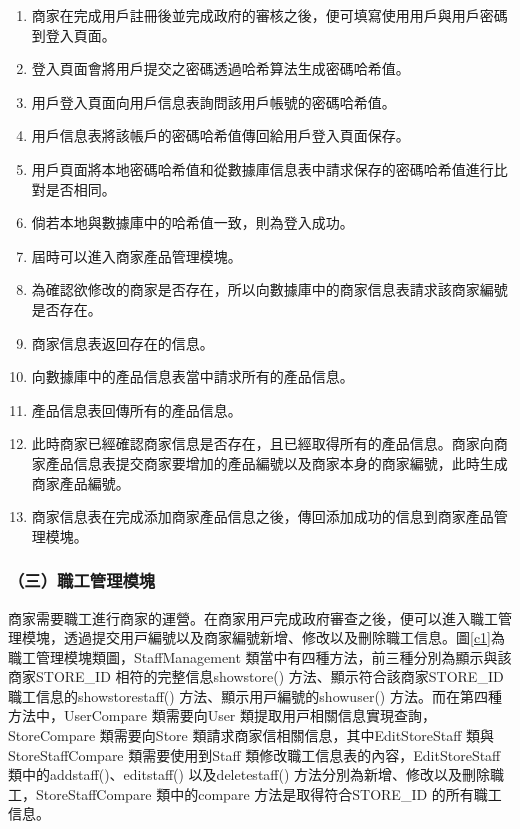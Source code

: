 	\begin{enumerate}
	\item 商家在完成用戶註冊後並完成政府的審核之後，便可填寫使用用戶與用戶密碼到登入頁面。
	\item 登入頁面會將用戶提交之密碼透過哈希算法生成密碼哈希值。
	\item 用戶登入頁面向用戶信息表詢問該用戶帳號的密碼哈希值。
	\item 用戶信息表將該帳戶的密碼哈希值傳回給用戶登入頁面保存。
	\item 用戶頁面將本地密碼哈希值和從數據庫信息表中請求保存的密碼哈希值進行比對是否相同。
	\item 倘若本地與數據庫中的哈希值一致，則為登入成功。
	\item 屆時可以進入商家產品管理模塊。
	\item 為確認欲修改的商家是否存在，所以向數據庫中的商家信息表請求該商家編號是否存在。
	\item 商家信息表返回存在的信息。
	\item 向數據庫中的產品信息表當中請求所有的產品信息。
	\item 產品信息表回傳所有的產品信息。
	\item 此時商家已經確認商家信息是否存在，且已經取得所有的產品信息。商家向商家產品信息表提交商家要增加的產品編號以及商家本身的商家編號，此時生成商家產品編號。
	\item 商家信息表在完成添加商家產品信息之後，傳回添加成功的信息到商家產品管理模塊。
	\end{enumerate}


\subsubsection{（三）職工管理模塊}
商家需要職⼯進⾏商家的運營。在商家⽤⼾完成政府審查之後，便可以進⼊職⼯管理模塊，透過提交⽤⼾編號以及商家編號新增、修改以及刪除職⼯信息。圖\ref{c1}為職⼯管理模塊類圖，StaffManagement 類當中有四種⽅法，前三種分別為顯⽰與該商家STORE\_ID 相符的完整信息showstore() ⽅法、顯⽰符合該商家STORE\_ID 職⼯信息的showstorestaff() ⽅法、顯⽰⽤⼾編號的showuser() ⽅法。而在第四種方法中，UserCompare 類需要向User 類提取⽤⼾相關信息實現查詢，StoreCompare 類需要向Store 類請求商家信相關信息，其中EditStoreStaff 類與StoreStaffCompare 類需要使⽤到Staff 類修改職⼯信息表的內容，EditStoreStaff 類中的addstaff()、editstaff() 以及deletestaff() ⽅法分別為新增、修改以及刪除職⼯，StoreStaffCompare 類中的compare ⽅法是取得符合STORE\_ID 的所有職⼯信息。

